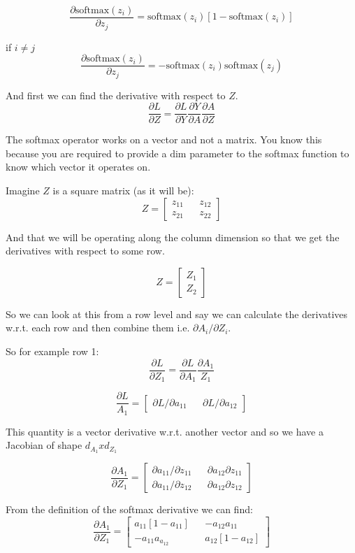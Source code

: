 \documentclass{article}
\begin{document}
$$
\frac{\partial \text{softmax}(z_i)}{\partial z_j} =
\text{softmax}(z_i)\left[1 - \text{softmax}(z_i)\right]
$$

if $i \ne j$
$$
\frac{\partial \text{softmax}(z_i)}{\partial z_j} = -
\text{softmax}(z_i)\text{softmax}(z_j)
$$

And first we can find the derivative with respect to $Z$.
$$
\frac{\partial L}{\partial Z} = \frac{\partial L}{\partial Y}
\frac{\partial Y}{\partial A}\frac{\partial A}{\partial Z}
$$

The softmax operator works on a vector and not a matrix. You know this
because you are required to provide a $\text{dim}$ parameter to the 
softmax function to know which vector it operates on.

Imagine $Z$ is a square matrix (as it will be):
$$
Z = \begin{bmatrix}
    z_{11} && z_{12} \\ z_{21} && z_{22}
\end{bmatrix}
$$

And that we will be operating along the column dimension so that we
get the derivatives with respect to some row.

$$
Z = \begin{bmatrix}
    Z_1 \\ Z_2
\end{bmatrix}
$$

So we can look at this from a row level and say we can calculate the
derivatives w.r.t. each row and then combine them i.e. 
$\partial A_i / \partial Z_i$.

So for example row 1:
$$
\frac{\partial L}{\partial Z_1} =
\frac{\partial L}{\partial A_1}
\frac{\partial A_1}{Z_1}
$$

$$
\frac{\partial L}{A_1} = \begin{bmatrix}
    \partial L / \partial a_{11} && \partial L / \partial a_{12}
\end{bmatrix}
$$

This quantity is a vector derivative w.r.t. another vector and so we have
a Jacobian of shape $d_{A_1} x d_{Z_1}$

$$
\frac{\partial A_1}{\partial Z_1} = \begin{bmatrix}
    \partial a_{11} / \partial z_{11} && \partial a_{12} \partial z_{11} \\
    \partial a_{11} / \partial z_{12} && \partial a_{12} \partial z_{12}
\end{bmatrix}
$$

From the definition of the softmax derivative we can find:
$$
\frac{\partial A_1}{\partial Z_1} = \begin{bmatrix}
    a_{11}\left[1 - a_{11}\right] && 
    -a_{12}a_{11} \\
    -a_{11}a_{a_{12}} && 
    a_{12}\left[1 - a_{12}\right]
\end{bmatrix}
$$
\end{document}

